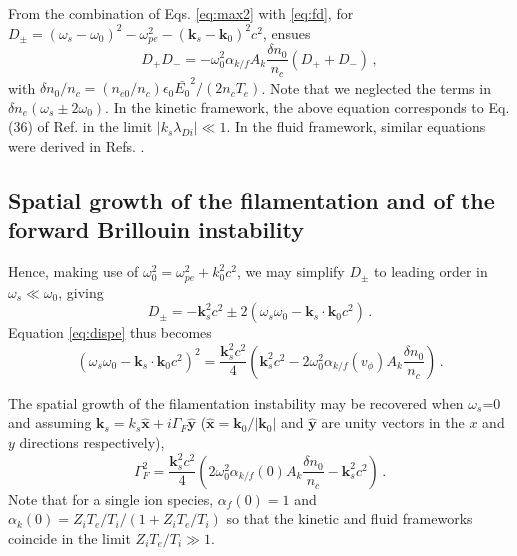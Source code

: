 \documentclass[
 reprint,
 amsmath,amssymb,
 aps,
]{revtex4-1}
\begin{document}
From the combination of  Eqs. \eqref{eq:max2} with \eqref{eq:fd}, 
for $D_\pm= (\omega_s-\omega_0)^2 - \omega_{pe}^2 -( \mathbf{k}_s-\mathbf{k}_0) ^2c^2 $, ensues
\begin{equation}\label{eq:dispe}
    D_+D_- = -\omega_{0}^2\alpha_{k/f}A_k\frac{\delta n_0}{n_c} (D_++D_-) \, ,
\end{equation}
with $\delta n_0/n_c = (n_{e0}/n_c) \epsilon_0\bar{E_0}^2/(2n_c T_e)$.
Note that we neglected the terms in $\delta n_e(\omega_s \pm 2\omega_0)$.
In the kinetic framework, the above equation corresponds to Eq. (36) of Ref. \cite[]{POF_Cohen_79} in the limit $\vert k_s \lambda_{Di} \vert \ll 1$. In the fluid framework, similar equations were derived in Refs. \cite[]{Kruer,phd_Michel,phd-Grech}.

\subsection{Spatial growth of the filamentation and of the forward Brillouin instability}
Hence,  making use of $\omega_0^2=\omega_{pe}^2 +k_0^2c^2$, we may simplify $D_\pm$ to leading order in $\omega_s\ll\omega_0$, giving 
\begin{equation}\label{eq:dpm}
D_\pm = -\mathbf{k}_s^2c^2\pm 2(\omega_s\omega_0 - \mathbf{k}_s\cdot\mathbf{k}_0 c^2) \, .
\end{equation} 
Equation \eqref{eq:dispe} thus becomes 
\begin{equation}\label{eq:dispe2} 
(\omega_s\omega_0 - \mathbf{k}_s\cdot\mathbf{k}_0 c^2)^2
=\frac{\mathbf{k}_s^2c^2}{4}\left( \mathbf{k}_s^2c^2 - 2\omega_{0}^2\alpha_{k/f}(v_\phi)A_k\frac{\delta n_0}{n_c} \right) 
\, .
\end{equation}

The spatial growth of the filamentation instability may be recovered when $\omega_s$=0 and assuming $\mathbf{k}_s = k_s \hat{\mathbf{x}} +i\Gamma_F \hat{\mathbf{y}}$ ($\hat{\mathbf{x}}=\mathbf{k}_0 /\vert \mathbf{k}_0 \vert $ and  $\hat{\mathbf{y}}$  are unity vectors in the $x$ and $y$ directions respectively),
\begin{equation}\label{eq:gf} 
\Gamma_F^2
=\frac{\mathbf{k}_s^2c^2}{4}\left( 2\omega_{0}^2\alpha_{k/f}(0)A_k\frac{\delta n_0}{n_c}- \mathbf{k}_s^2c^2 \right) 
\, .
\end{equation}
Note that for a single ion species,  $\alpha_f(0)=1$ and $\alpha_k(0)= Z_iT_e/T_i/(1+Z_iT_e/T_i)$ so that the kinetic and fluid frameworks coincide in the limit $Z_iT_e/T_i\gg 1$.
\end{document}
